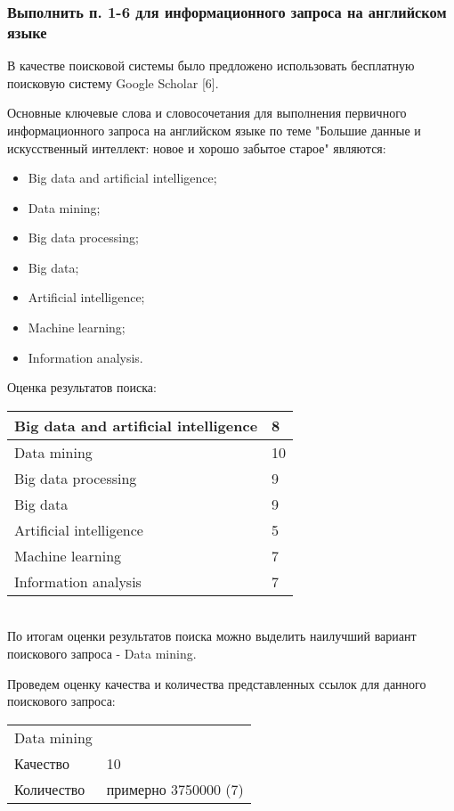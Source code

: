 \documentclass[14pt,a4paper,report]{report}
\begin{document}
\subsubsection{Выполнить п. 1-6 для информационного запроса на английском языке}

В качестве поисковой системы было предложено использовать бесплатную поисковую систему Google Scholar [6].

Основные ключевые слова и словосочетания для выполнения первичного информационного запроса на английском языке по теме "Большие данные и искусственный интеллект: новое и хорошо забытое старое" являются:
\begin{itemize}
	\item Big data and artificial intelligence;
	\item Data mining;
	\item Big data processing;
	\item Big data;
	\item Artificial intelligence;
	\item Machine learning;
	\item Information analysis.
\end{itemize}

Оценка результатов поиска:\\

\begin{tabular}{ | l | l | }
\hline
Big data and artificial intelligence & 8 \\ \hline
Data mining & 10 \\ \hline
Big data processing & 9 \\ \hline
Big data & 9\\ \hline
Artificial intelligence & 5 \\ \hline
Machine learning & 7 \\ \hline
Information analysis & 7 \\
\hline
\end{tabular}\\

По итогам оценки результатов поиска можно выделить наилучший вариант поискового запроса - Data mining.

Проведем оценку качества и количества представленных ссылок для данного поискового запроса:\\

\begin{tabular}{ l l }
Data mining \\
Качество & 10 \\
Количество & примерно 3750000 (7) \\
\end{tabular}\\
\end{document}
